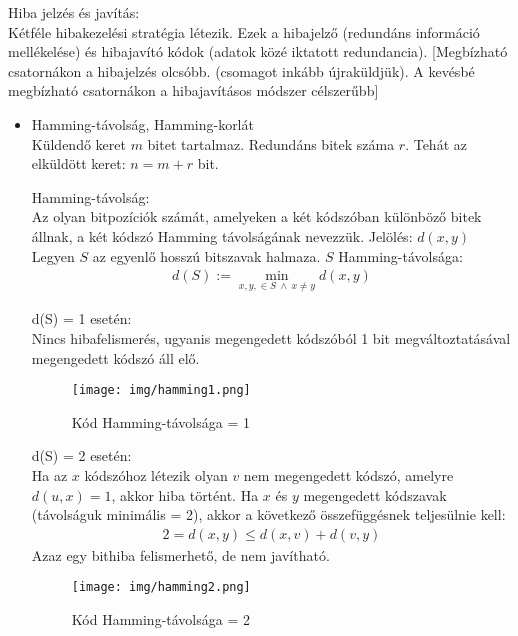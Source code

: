 \documentclass[margin=0px]{article}
\begin{document}
\begin{description}
        Hiba jelzés és javítás:\\
        Kétféle hibakezelési stratégia létezik. Ezek a hibajelző (redundáns információ mellékelése) és hibajavító kódok (adatok közé iktatott redundancia).
            [Megbízható csatornákon a hibajelzés olcsóbb. (csomagot inkább újraküldjük). A kevésbé megbízható csatornákon a hibajavításos módszer célszerűbb]
        \begin{itemize}
            \item Hamming-távolság, Hamming-korlát \\
                  Küldendő keret $m$ bitet tartalmaz. Redundáns bitek száma $r$. Tehát az elküldött keret: $n = m+r$ bit.

                  Hamming-távolság: \\
                  Az olyan bitpozíciók számát, amelyeken a két kódszóban különböző bitek állnak, a két kódszó Hamming távolságának nevezzük. Jelölés: $d(x,y)$\\
                  Legyen $S$ az egyenlő hosszú bitszavak halmaza. $S$ Hamming-távolsága:
                  \begin{align*}
                      d(S) := \min_{x,y, \in S \ \land \ x \neq y} d(x,y)
                  \end{align*}

                  d(S) = 1 esetén: \\
                  Nincs hibafelismerés, ugyanis megengedett kódszóból 1 bit megváltoztatásával megengedett kódszó áll elő.
                  \begin{figure}[H]
                      \centering
                      \texttt{[image: img/hamming1.png]}
                      \caption{Kód Hamming-távolsága = 1}
                  \end{figure}
                  d(S) = 2 esetén: \\
                  Ha az $x$ kódszóhoz létezik olyan $v$ nem megengedett kódszó, amelyre $d(u,x)=1$, akkor hiba történt. Ha $x$ és $y$ megengedett kódszavak (távolságuk minimális = 2), akkor a következő összefüggésnek teljesülnie kell:
                  \begin{align*}
                      2 = d(x,y) \leq d(x,v)+d(v,y)
                  \end{align*}
                  Azaz egy bithiba felismerhető, de nem javítható.
                  \begin{figure}[H]
                      \centering
                      \texttt{[image: img/hamming2.png]}
                      \caption{Kód Hamming-távolsága = 2}
                  \end{figure}


\end{itemize}
\end{description}
\end{document}

